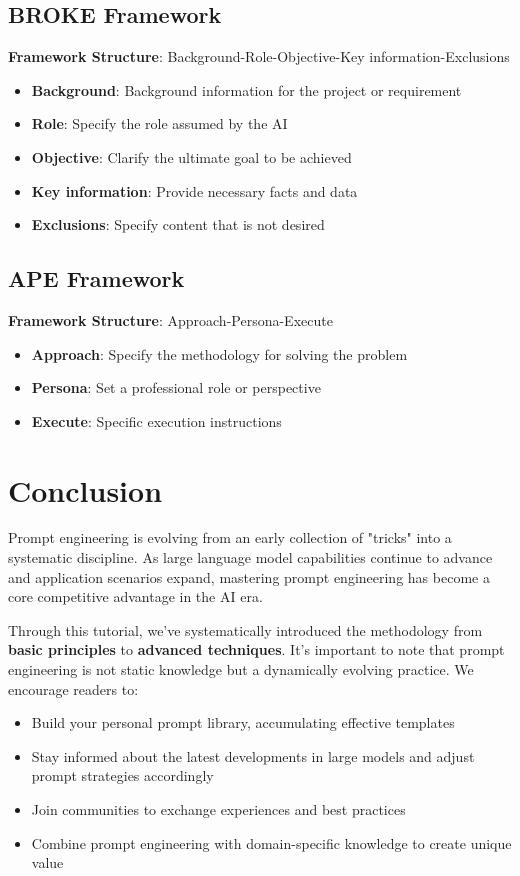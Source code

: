 \documentclass[12pt]{article}
\begin{document}
\subsection{BROKE Framework}
\textbf{Framework Structure}: Background-Role-Objective-Key information-Exclusions
\begin{itemize}
  \item \textbf{Background}: Background information for the project or requirement
  \item \textbf{Role}: Specify the role assumed by the AI
  \item \textbf{Objective}: Clarify the ultimate goal to be achieved
  \item \textbf{Key information}: Provide necessary facts and data
  \item \textbf{Exclusions}: Specify content that is not desired
\end{itemize}

\subsection{APE Framework}
\textbf{Framework Structure}: Approach-Persona-Execute
\begin{itemize}
  \item \textbf{Approach}: Specify the methodology for solving the problem
  \item \textbf{Persona}: Set a professional role or perspective
  \item \textbf{Execute}: Specific execution instructions
\end{itemize}

\section{Conclusion}

Prompt engineering is evolving from an early collection of "tricks" into a systematic discipline. As large language model capabilities continue to advance and application scenarios expand, mastering prompt engineering has become a core competitive advantage in the AI era.

Through this tutorial, we've systematically introduced the methodology from \textbf{basic principles} to \textbf{advanced techniques}. It's important to note that prompt engineering is not static knowledge but a dynamically evolving practice. We encourage readers to:

\begin{itemize}
  \item Build your personal prompt library, accumulating effective templates
  \item Stay informed about the latest developments in large models and adjust prompt strategies accordingly
  \item Join communities to exchange experiences and best practices
  \item Combine prompt engineering with domain-specific knowledge to create unique value
\end{itemize}
\end{document}
